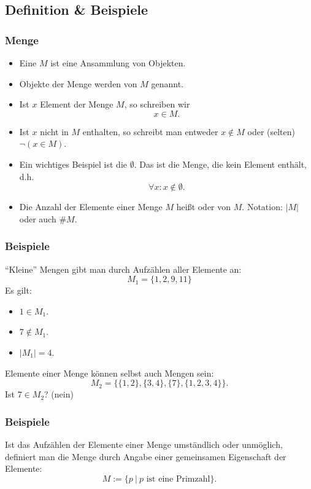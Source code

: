 \subsection{Definition \& Beispiele}
%
\begin{frame}\frametitle{Menge}

	\begin{itemize}
		\item<1-> Eine  $M$ ist eine Ansammlung von Objekten.
		\item<2-> Objekte der Menge werden  von $M$ genannt.
		\item<3-> Ist $x$ Element der Menge $M$, so schreiben wir 
			$$
				x\in M.
			$$
		\item<3-> Ist $x$ nicht in $M$ enthalten, so schreibt man entweder $x \notin M$ oder (selten) $\neg(x\in M)$. 
		\item<4-> Ein wichtiges Beispiel ist die  $\emptyset$. Das ist die Menge, die kein Element enthält, 
			d.h.
			$$
				\forall x: x\notin \emptyset.
			$$
		\item<5-> Die Anzahl der Elemente einer Menge $M$ hei{\ss}t  oder  von $M$.
			Notation: $|M|$ oder auch $\#M$.
	\end{itemize}

\end{frame}
%
%
\begin{frame}\frametitle{Beispiele}
	
	``Kleine'' Mengen gibt man durch Aufzählen aller Elemente an: 
	$$
		M_1 = \{1,2,9,11\}
	$$
	\pause
	Es gilt:
	\begin{itemize}
		\item $1 \in M_1$.
		\item $7 \notin M_1$.
		\item $|M_1| = 4$.
	\end{itemize}
	
	\pause
	\vfill
	Elemente einer Menge können selbst auch Mengen sein:
	$$
		M_2 = \big\{ \{1,2\}, \{3,4\}, \{7\}, \{1,2,3,4\} \big\}.
	$$
	Ist $7\in M_2$?
	\pause
	(nein)
\end{frame}
%
%
\begin{frame}\frametitle{Beispiele}
	
	Ist das Aufzählen der Elemente einer Menge umständlich oder unmöglich, 
	definiert man die Menge durch Angabe einer gemeinsamen Eigenschaft der Elemente:
	$$
		M := \big\{p ~|~ p \text{~ist eine Primzahl}\big\}.
	$$

	
\end{frame}
